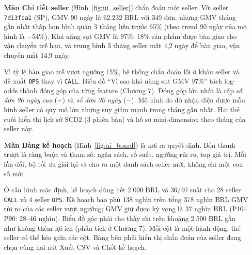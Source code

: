 \textbf{Màn Chi tiết seller} (Hình~\ref{fig:ui_seller}) chẩn đoán một seller. Với seller \texttt{7d13fca1} (SP), GMV 90 ngày là 62.232 BRL với 349 đơn, nhưng GMV tháng gần nhất thấp hơn bình quân 3 tháng liền trước 65\% (theo trend 90 ngày của mô hình là −54\%). Khả năng sụt GMV là 97\%; 18\% sản phẩm được bàn giao cho vận chuyển trễ hạn, và trung bình 3 tháng seller mất 4,2 ngày để bàn giao, vận chuyển mất 14,9 ngày.

Vì tỷ lệ bàn giao trễ vượt ngưỡng 15\%, hệ thống chẩn đoán lỗi ở khâu seller và đề xuất \texttt{OPS} thay vì \texttt{CALL}. Biểu đồ ``Vì sao khả năng sụt GMV 97\%'' tách log-odds thành đóng góp của từng feature (Chương 7). Đóng góp lớn nhất là cặp \emph{số đơn 90 ngày cao} (+) và \emph{số đơn 30 ngày} (−). Mô hình do đó nhận diện được mẫu hình seller có quy mô lớn nhưng suy giảm mạnh trong tháng gần nhất. Hai thẻ cuối hiển thị lịch sử SCD2 (3 phiên bản) và hồ sơ mini-dimension theo tháng của seller này.


\textbf{Màn Bảng kế hoạch} (Hình~\ref{fig:ui_board}) là nơi ra quyết định.  Bốn thanh trượt là ràng buộc và tham số: ngân sách, số suất, ngưỡng rủi ro, top giá trị. Mỗi lần đổi, bộ tối ưu giải lại và cho ra một danh sách seller mới, không chỉ một con số mới.

 Ở cấu hình mặc định, kế hoạch dùng hết 2.000 BRL và 36/40 suất cho 28 seller \texttt{CALL} và 4 seller \texttt{OPS}. Kế hoạch bao phủ 138 nghìn trên tổng 378 nghìn BRL GMV rủi ro của các seller vượt ngưỡng; GMV giữ được kỳ vọng là 37 nghìn BRL (P10--P90: 28--46 nghìn).  Biểu đồ góc phải cho thấy chi trên khoảng 2.500 BRL gần như không thêm lợi ích (phân tích ở Chương 7).  Mỗi cột là một hành động; thẻ seller có thể kéo giữa các cột.  Bảng bên phải hiển thị chẩn đoán của seller đang chọn cùng hai nút Xuất CSV và Chốt kế hoạch.


